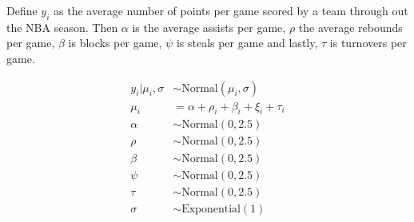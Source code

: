 \documentclass[
  letterpaper,
  DIV=11,
  numbers=noendperiod]{scrartcl}
\begin{document}
Define \(y_i\) as the average number of points per game scored by a team
through out the NBA season. Then \(\alpha\) is the average assists per
game, \(\rho\) the average rebounds per game, \(\beta\) is blocks per
game, \(\psi\) is steals per game and lastly, \(\tau\) is turnovers per
game.

\begin{align} 
y_i|\mu_i, \sigma &\sim \mbox{Normal}(\mu_i, \sigma) \\
\mu_i &= \alpha + \rho_i + \beta_i + \xi_i + \tau_i \\
\alpha &\sim \mbox{Normal}(0, 2.5) \\
\rho &\sim \mbox{Normal}(0, 2.5) \\
\beta &\sim \mbox{Normal}(0, 2.5) \\
\psi &\sim \mbox{Normal}(0,2.5) \\
\tau &\sim \mbox{Normal}(0,2.5) \\
\sigma &\sim \mbox{Exponential}(1) \\
\end{align}
\end{document}
